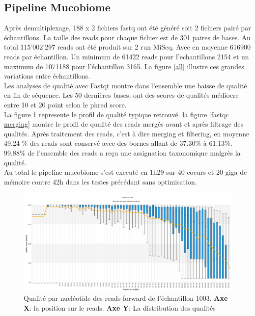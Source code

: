 \documentclass[12pt,a4paper]{article}
\begin{document}
\subsection{Pipeline Mucobiome}
Après demultiplexage, 188 x 2 fichiers fastq ont été généré soit 2 fichiers pairé par échantillons.
La taille des reads pour chaque fichier est de 301 paires de bases.
Au total 115’002’297 reads ont été produit sur 2 run MiSeq. Avec en moyenne 616900 reads par échantillon. Un minimum de 61422 reads pour l’echantillons 2154 et un maximum de 1071188 pour l’échantillon 3165. La figure \ref{all} illustre ces grandes variations entre échantillons. \\
Les analyses de qualité avec Fastqt montre dans l’ensemble une baisse de qualité en fin de séquence. Les 50 dernières bases, ont des scores de qualités médiocre entre 10 et 20 point selon le phred score.\\
 La figure \ref{fastqcquality} represente le profil de qualité typique retrouvé. la figure \ref{fastqc merging} montre le profil de qualité des reads mergés avant et après filtrage des qualités.
Après traitement des reads, c’est à dire merging et filtering, en moyenne 49.24 \% des reads sont conservé avec des bornes allant de 37.30\% à 61.13\%. \\
99.88\% de l'ensemble des reads a reçu une assignation taxonomique malgrès la qualité. \\
Au total le pipeline mucobiome s’est executé en 1h29 sur 40 coeurs et 20 giga de mémoire contre 42h dans les testes précédant sans optimisation.

\begin{figure}[ht]
\begin{center}
\includegraphics[scale=0.45]{img/1003_forward.png}\hfill
\end{center}
\caption{Qualité par nucléotide des reads forward de l'échantillon 1003. \textbf{Axe X}: la position sur le reads. \textbf{Axe Y}: La distribution des qualités}
\label{fastqcquality}
\end{figure}
\end{document}
